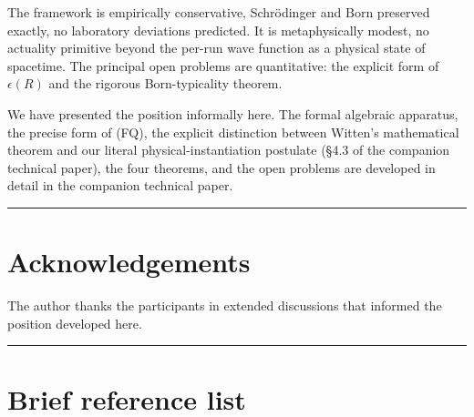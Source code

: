 \documentclass[11pt,a4paper]{article}
\begin{document}
The framework is empirically conservative, Schrödinger and Born preserved exactly, no laboratory deviations predicted. It is metaphysically modest, no actuality primitive beyond the per-run wave function as a physical state of spacetime. The principal open problems are quantitative: the explicit form of $\epsilon(R)$ and the rigorous Born-typicality theorem.

We have presented the position informally here. The formal algebraic apparatus, the precise form of (FQ), the explicit distinction between Witten's mathematical theorem and our literal physical-instantiation postulate (§4.3 of the companion technical paper), the four theorems, and the open problems are developed in detail in the companion technical paper.

\medskip\hrule\medskip

\section{Acknowledgements}

The author thanks the participants in extended discussions that informed the position developed here.

\medskip\hrule\medskip

\section{Brief reference list}
\end{document}
